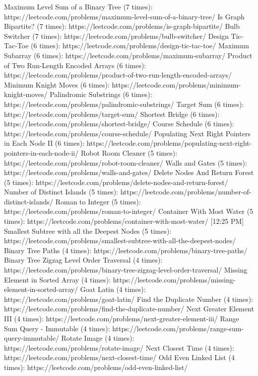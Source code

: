 Maximum Level Sum of a Binary Tree (7 times): https://leetcode.com/problems/maximum-level-sum-of-a-binary-tree/
Is Graph Bipartite? (7 times): https://leetcode.com/problems/is-graph-bipartite/
Bulb Switcher (7 times): https://leetcode.com/problems/bulb-switcher/
Design Tic-Tac-Toe (6 times): https://leetcode.com/problems/design-tic-tac-toe/
Maximum Subarray (6 times): https://leetcode.com/problems/maximum-subarray/
Product of Two Run-Length Encoded Arrays (6 times): https://leetcode.com/problems/product-of-two-run-length-encoded-arrays/
Minimum Knight Moves (6 times): https://leetcode.com/problems/minimum-knight-moves/
Palindromic Substrings (6 times): https://leetcode.com/problems/palindromic-substrings/
Target Sum (6 times): https://leetcode.com/problems/target-sum/
Shortest Bridge (6 times): https://leetcode.com/problems/shortest-bridge/
Course Schedule (6 times): https://leetcode.com/problems/course-schedule/
Populating Next Right Pointers in Each Node II (6 times): https://leetcode.com/problems/populating-next-right-pointers-in-each-node-ii/
Robot Room Cleaner (5 times): https://leetcode.com/problems/robot-room-cleaner/
Walls and Gates (5 times): https://leetcode.com/problems/walls-and-gates/
Delete Nodes And Return Forest (5 times): https://leetcode.com/problems/delete-nodes-and-return-forest/
Number of Distinct Islands (5 times): https://leetcode.com/problems/number-of-distinct-islands/
Roman to Integer (5 times): https://leetcode.com/problems/roman-to-integer/
Container With Most Water (5 times): https://leetcode.com/problems/container-with-most-water/
[12:25 PM]
Smallest Subtree with all the Deepest Nodes (5 times): https://leetcode.com/problems/smallest-subtree-with-all-the-deepest-nodes/
Binary Tree Paths (4 times): https://leetcode.com/problems/binary-tree-paths/
Binary Tree Zigzag Level Order Traversal (4 times): https://leetcode.com/problems/binary-tree-zigzag-level-order-traversal/
Missing Element in Sorted Array (4 times): https://leetcode.com/problems/missing-element-in-sorted-array/
Goat Latin (4 times): https://leetcode.com/problems/goat-latin/
Find the Duplicate Number (4 times): https://leetcode.com/problems/find-the-duplicate-number/
Next Greater Element III (4 times): https://leetcode.com/problems/next-greater-element-iii/
Range Sum Query - Immutable (4 times): https://leetcode.com/problems/range-sum-query-immutable/
Rotate Image (4 times): https://leetcode.com/problems/rotate-image/
Next Closest Time (4 times): https://leetcode.com/problems/next-closest-time/
Odd Even Linked List (4 times): https://leetcode.com/problems/odd-even-linked-list/
